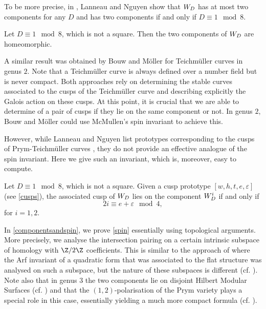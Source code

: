 \documentclass{amsart}
\def\ep{\varepsilon}
\begin{document}
To be more precise, in \cite{lanneaunguyen}, Lanneau and Nguyen show that $\W$ has at most two components for any $D$ and has two components if and only if $D\equiv 1\mod 8$.

\begin{theorem}\label{comphomeo}
Let $D\equiv 1\mod 8$, which is not a square. Then the two components of $\W$ are homeomorphic.
\end{theorem}

A similar result was obtained by Bouw and Möller %
\cite{BMFuchs} for Teichmüller curves in genus $2$. Note that a Teichmüller curve is always defined over a number field but is never compact. Both approaches rely on determining the stable curves associated to the cusps of the Teichmüller curve and describing explicitly the Galois action on these cusps. At this point, it is crucial that we are able to determine of a pair of cusps if they lie on the same component or not. In genus $2$, Bouw and Möller could use McMullen's spin invariant \cite{mcmullenspin} to achieve this.


However, while Lanneau and Nguyen list prototypes corresponding to the cusps of Prym-Teichmüller curves \cite{lanneaunguyen}, they do not provide an effective analogue of the spin invariant. Here we give such an invariant, which is, moreover, easy to compute.


\begin{theorem}\label{spin}
Let $D\equiv 1\mod 8$, which is not a square. Given a cusp prototype $[w,h,t,e,\ep]$ (see \autoref{cusps}), the associated cusp of $\W$ lies on the component $\W^i$ if and only if
\[2i\equiv e+\ep\mod 4,\]
for $i=1,2$.
\end{theorem}

In \autoref{componentsandspin}, we prove \autoref{spin} essentially using topological arguments. More precisely, we analyse the intersection pairing on a certain intrinsic subspace of homology with $\Z/2\Z$ coefficients. This is similar to the approach of \cite{mcmullenspin} where the Arf invariant of a quadratic form that was associated to the flat structure was analysed on such a subspace, but the nature of these subspaces is different (cf. \cite[Remark 2.9]{lanneaunguyen}). Note also that in genus $3$ the two components lie on disjoint Hilbert Modular Surfaces (cf. \cite[Proposition 4.6]{moellerprym}) and that the $(1,2)$-polarisation of the Prym variety plays a special role in this case, essentially yielding a much more compact formula (cf. \cite[Theorem 5.3]{mcmullenspin}).
\end{document}
